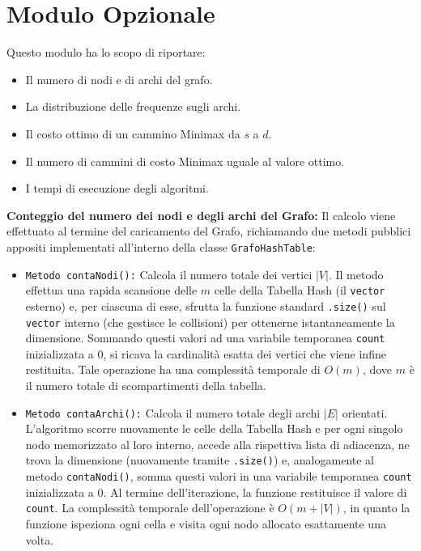 \documentclass[12pt, a4paper]{article}
\begin{document}
\section*{Modulo Opzionale}
Questo modulo ha lo scopo di riportare: 
\begin{itemize}
    \item[-] Il numero di nodi e di archi del grafo.
    \item[-] La distribuzione delle frequenze sugli archi.
    \item[-] Il costo ottimo di un cammino Minimax da $s$ a $d$.
    \item[-] Il numero di cammini di costo Minimax uguale al valore ottimo.
    \item[-] I tempi di esecuzione degli algoritmi.
\end{itemize}
{\large\textbf{Conteggio del numero dei nodi e degli archi del Grafo:}} 
Il calcolo viene effettuato al termine del caricamento del Grafo, richiamando due metodi pubblici appositi implementati all'interno della classe \texttt{GrafoHashTable}:
\begin{itemize}
    \item[-] \texttt{Metodo \texttt{contaNodi()}:} Calcola il numero totale dei vertici $|V|$. Il metodo effettua una rapida scansione delle $m$ celle della Tabella Hash (il \texttt{vector} esterno) e, per ciascuna di esse, sfrutta la funzione standard \texttt{.size()} sul \texttt{vector} interno (che gestisce le collisioni) per ottenerne istantaneamente la dimensione. Sommando questi valori ad una variabile temporanea \texttt{count} inizializzata a $0$, si ricava la cardinalità esatta dei vertici che viene infine restituita. Tale operazione ha una complessità temporale di $O(m)$, dove $m$ è il numero totale di scompartimenti della tabella.
    \item[-] \texttt{Metodo \texttt{contaArchi()}:} Calcola il numero totale degli archi $|E|$ orientati. L'algoritmo scorre nuovamente le celle della Tabella Hash e per ogni singolo nodo memorizzato al loro interno, accede alla rispettiva lista di adiacenza, ne trova la dimensione (nuovamente tramite \texttt{.size()}) e, analogamente al metodo \texttt{contaNodi()}, somma questi valori in una variabile temporanea \texttt{count} inizializzata a $0$. Al termine dell'iterazione, la funzione restituisce il valore di \texttt{count}. La complessità temporale dell'operazione è $O(m + |V|)$, in quanto la funzione ispeziona ogni cella e visita ogni nodo allocato esattamente una volta.
\end{itemize}
\end{document}
